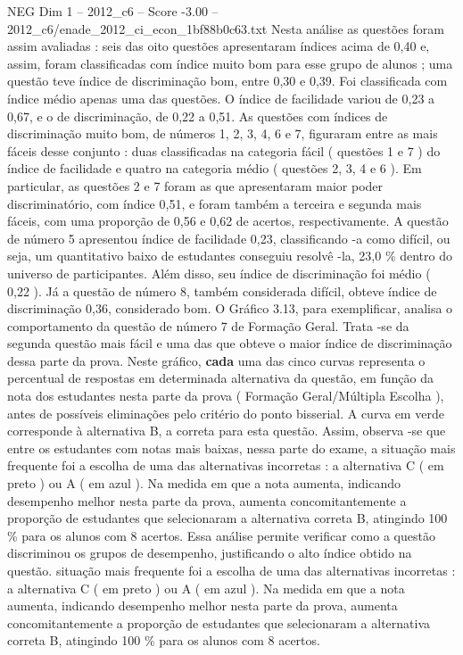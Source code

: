 \begin{textsample}{NEG Dim 1 – 2012\_c6 – Score -3.00 – 2012\_c6/enade\_2012\_ci\_econ\_1bf88b0c63.txt}
Nesta análise as questões foram assim avaliadas : seis das oito questões apresentaram índices acima de 0,40 e, assim, foram classificadas com índice muito bom para esse grupo de alunos ; uma questão teve índice de discriminação bom, entre 0,30 e 0,39.
Foi classificada com índice médio apenas uma das questões.
O índice de facilidade variou de 0,23 a 0,67, e o de discriminação, de 0,22 a 0,51.
As questões com índices de discriminação muito bom, de números 1, 2, 3, 4, 6 e 7, figuraram entre as mais fáceis desse conjunto : duas classificadas na categoria fácil ( questões 1 e 7 ) do índice de facilidade e quatro na categoria médio ( questões 2, 3, 4 e 6 ).
Em particular, as questões 2 e 7 foram as que apresentaram maior poder discriminatório, com índice 0,51, e foram também a terceira e segunda mais fáceis, com uma proporção de 0,56 e 0,62 de acertos, respectivamente.
A questão de número 5 apresentou índice de facilidade 0,23, classificando -a como difícil, ou seja, um quantitativo baixo de estudantes conseguiu resolvê -la, 23,0 \% dentro do universo de participantes.
Além disso, seu índice de discriminação foi médio ( 0,22 ).
Já a questão de número 8, também considerada difícil, obteve índice de discriminação 0,36, considerado bom.
O Gráfico 3.13, para exemplificar, analisa o comportamento da questão de número 7 de Formação Geral.
Trata -se da segunda questão mais fácil e uma das que obteve o maior índice de discriminação dessa parte da prova.
Neste gráfico, \textbf{cada} uma das cinco curvas representa o percentual de respostas em determinada alternativa da questão, em função da nota dos estudantes nesta parte da prova ( Formação Geral/Múltipla Escolha ), antes de possíveis eliminações pelo critério do ponto bisserial.
A curva em verde corresponde à alternativa B, a correta para esta questão.
Assim, observa -se que entre os estudantes com notas mais baixas, nessa parte do exame, a situação mais frequente foi a escolha de uma das alternativas incorretas : a alternativa C ( em preto ) ou A ( em azul ).
Na medida em que a nota aumenta, indicando desempenho melhor nesta parte da prova, aumenta concomitantemente a proporção de estudantes que selecionaram a alternativa correta B, atingindo 100 \% para os alunos com 8 acertos.
Essa análise permite verificar como a questão discriminou os grupos de desempenho, justificando o alto índice obtido na questão. situação mais frequente foi a escolha de uma das alternativas incorretas : a alternativa C ( em preto ) ou A ( em azul ).
Na medida em que a nota aumenta, indicando desempenho melhor nesta parte da prova, aumenta concomitantemente a proporção de estudantes que selecionaram a alternativa correta B, atingindo 100 \% para os alunos com 8 acertos.

\end{textsample}
